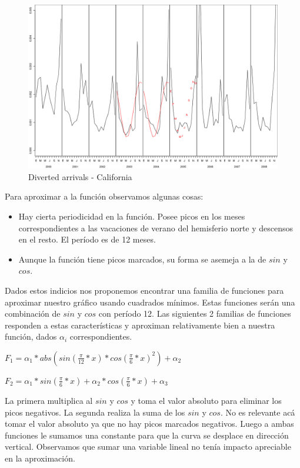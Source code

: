 \documentclass{endm}
\begin{document}
\begin{figure}[h!]
  \begin{center}
	\includegraphics[scale=0.4]{img/plot_CA_2003-2005.png}
	\caption{Diverted arrivals - California}
  \end{center}
\end{figure}

Para aproximar a la funci\'on observamos algunas cosas:
\begin{itemize}  
\item Hay cierta periodicidad en la funci\'on. Posee picos en los meses correspondientes a las vacaciones de verano del hemisferio norte y descensos en el resto. El per\'iodo es de 12 meses.
\item Aunque la funci\'on tiene picos marcados, su forma se asemeja a la de $sin$ y $cos$.
\end{itemize}

Dados estos indicios nos proponemos encontrar una familia de funciones para aproximar nuestro gr\'afico usando cuadrados m\'inimos. Estas funciones ser\'an una combinaci\'on de $sin$ y $cos$ con per\'iodo 12. Las siguientes 2 familias de funciones responden a estas caracter\'isticas y aproximan relativamente bien a nuestra funci\'on, dados $\alpha_{i}$ correspondientes.


$F_1 = \alpha_1 * abs(sin(\frac{\pi}{12}*x) * cos(\frac{\pi}{6}*x)^2) + \alpha_2$

$F_2 = \alpha_1 * sin(\frac{\pi}{6}*x) + \alpha_2 * cos(\frac{\pi}{6}*x) + \alpha_3$


La primera multiplica al $sin$ y $cos$ y toma el valor absoluto para eliminar los picos negativos. La segunda realiza la suma de los $sin$ y $cos$. No es relevante ac\'a tomar el valor absoluto ya que no hay picos marcados negativos. Luego a ambas funciones le sumamos una constante para que la curva se desplace en direcci\'on vertical. Observamos que sumar una variable lineal no ten\'ia impacto apreciable en la aproximaci\'on. 
\end{document}
